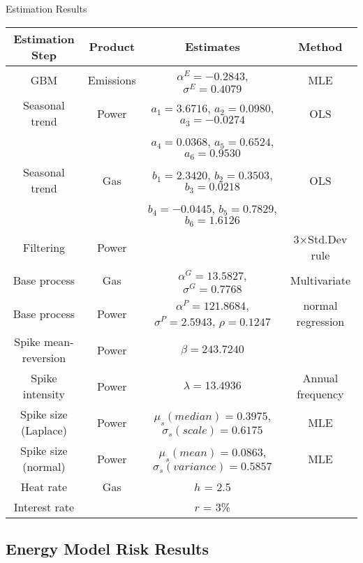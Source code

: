 {Estimation Results}
{\tiny
\begin{table}
\begin{center}
\begin{tabular}{c|c|c|c}
\hline
\textbf{Estimation Step} & \textbf{Product}  &  \textbf{Estimates}  & \textbf{Method} \\
\hline
GBM   &  Emissions   & $\alpha^E = -0.2843$, $\sigma^E = 0.4079$ & MLE  \\
\hline
Seasonal trend   & Power   & $a_1 = 3.6716$, $a_2 = 0.0980$, $a_3 = -0.0274$   & OLS  \\
 & & $a_4 = 0.0368$, $a_5 = 0.6524$, $a_6 = 0.9530$ & \\
\hline
Seasonal trend   & Gas  & $b_1 = 2.3420$, $b_2 = 0.3503$, $b_3 = 0.0218$   & OLS  \\
 & & $b_4 = -0.0445$, $b_5 = 0.7829$, $b_6 = 1.6126$ & \\
 \hline
 Filtering   & Power   &   & 3$\times$Std.Dev rule  \\
\hline
 Base process   & Gas & $\alpha^G = 13.5827$, $\sigma^G = 0.7768$  & Multivariate \\
  Base process   & Power  & $\alpha^P =121.8684$,  $\sigma^P = 2.5943$, $\rho = 0.1247$ & normal regression \\
\hline
Spike mean-reversion & Power & $\beta = 243.7240$ &   \\
Spike intensity & Power & $\lambda = 13.4936$ &  Annual frequency \\
Spike size (Laplace) & Power & $\mu_s (median)= 0.3975$, $\sigma_s (scale) = 0.6175$ & MLE \\
Spike size (normal) & Power & $\mu_s (mean) = 0.0863$, $\sigma_s (variance)  = 0.5857$ & MLE \\
\hline
Heat rate  & Gas  &  $h$ = 2.5&  \\
\hline
Interest rate  &   &  $r$ = 3\%&  \\
\end{tabular}
\end{center}
\label{estimates}
\end{table}
}

\subsection{Energy Model Risk Results}

